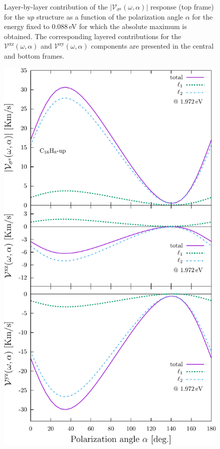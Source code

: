 \documentclass[prb,11pt,tightenlines,twocolumn,aps]{revtex4-1}
\begin{document}
\begin{figure}[t]
    \caption{Layer-by-layer contribution of the
    $|\mathcal{V}_{\sigma^{\mathrm{z}}}(\omega,\alpha)|$ response (top frame)
    for the \emph{up} structure as a function of the polarization angle
    $\alpha$ for the energy fixed to 0.088\,eV for which the absolute maximum
    is obtained.
    The corresponding layered contributions for the
    $\mathcal{V}^{\mathrm{xz}}(\omega,\alpha)$ and
    $\mathcal{V}^{\mathrm{zy}}(\omega,\alpha)$ components are presented in the
    central and bottom frames.}
    \label{fig:up-vsz-lay-1}
\end{figure}

\begin{figure}[t]
    \centering
    \includegraphics[width=\linewidth]{upplots/up-svaz-lay-2}
    

\end{figure}
\end{document}
